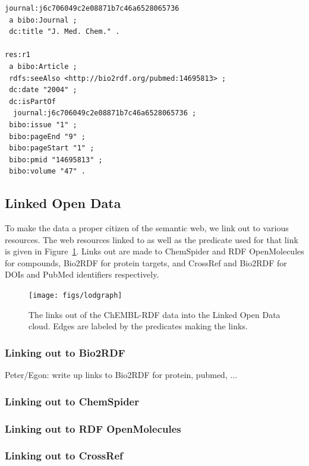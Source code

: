 \documentclass[sw]{iosart2c}
\begin{document}
\begin{footnotesize}
\begin{verbatim}
journal:j6c706049c2e08871b7c46a6528065736
 a bibo:Journal ;
 dc:title "J. Med. Chem." .

res:r1
 a bibo:Article ;
 rdfs:seeAlso <http://bio2rdf.org/pubmed:14695813> ;
 dc:date "2004" ;
 dc:isPartOf
  journal:j6c706049c2e08871b7c46a6528065736 ;
 bibo:issue "1" ;
 bibo:pageEnd "9" ;
 bibo:pageStart "1" ;
 bibo:pmid "14695813" ;
 bibo:volume "47" .
\end{verbatim}
\end{footnotesize}

\subsection{Linked Open Data}

To make the data a proper citizen of the semantic web, we link out to various resources.
The web resources linked to as well as the predicate used for that link is given in
Figure~\ref{2}.
Links out are made to ChemSpider and RDF OpenMolecules for compounds, Bio2RDF for
protein targets, and CrossRef and Bio2RDF for DOIs and PubMed identifiers respectively.

\begin{figure}[t]
\texttt{[image: figs/lodgraph]}
\caption{The links out of the ChEMBL-RDF data into the Linked Open Data cloud.
Edges are labeled by the predicates making the links.}\label{2}
\end{figure}

\subsubsection{Linking out to Bio2RDF}

Peter/Egon: write up links to Bio2RDF for protein, pubmed, ...

\subsubsection{Linking out to ChemSpider}

\subsubsection{Linking out to RDF OpenMolecules}

\subsubsection{Linking out to CrossRef}
\end{document}
